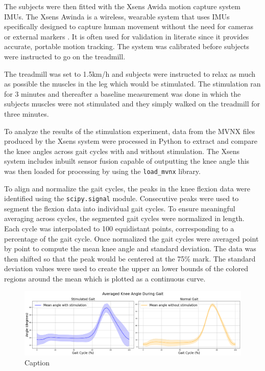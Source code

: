 The subjects were then fitted with the Xsens Awida  motion capture system IMUs. The Xsens Awinda is a wireless, wearable system that uses IMUs specifically designed to capture human movement without the need for cameras or external markers \cite{noauthor_mvn_nodate}. It is often used for validation in literate since it provides accurate, portable motion tracking. The system was calibrated before subjects were instructed to go on the treadmill. 


The treadmill was set to 1.5km/h and subjects were instructed to relax as much as possible the muscles in the leg which would be stimulated. The stimulation ran for 3 minutes and thereafter a baseline measurement was done in which the subjects muscles were not stimulated and they simply walked on the treadmill for three minutes. 

To analyze the results of the stimulation experiment, data from the MVNX files produced by the Xsens system were processed in Python to extract and compare the knee angles across gait cycles with and without stimulation. The Xsens system includes inbuilt sensor fusion capable of outputting the knee angle this was then loaded for processing by using the \texttt{load\_mvnx} library. 

To align and normalize the gait cycles, the peaks in the knee flexion data were identified using the \texttt{scipy.signal} module. Consecutive peaks were used to segment the flexion data into individual gait cycles. To ensure meaningful averaging across cycles, the segmented gait cycles were normalized in length. Each cycle was interpolated to 100 equidistant points, corresponding to a percentage of the gait cycle. Once normalized the gait cycles were averaged point by point to compute the mean knee angle and standard deviation. The data was then shifted so that the peak would be centered at the 75\% mark. The standard deviation values were used to create the upper an lower bounds of the colored regions around the mean which is plotted as a continuous curve. 

\begin{figure}[h]
    \centering
    \includegraphics[width=0.99\linewidth]{images/alexisoutput1.png}
    \caption{Caption}
    \label{fig:alexisout}
\end{figure}

